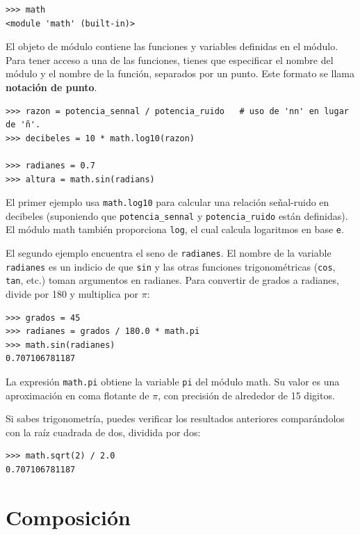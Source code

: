 \documentclass[10pt]{book}
\begin{document}
\begin{verbatim}
>>> math
<module 'math' (built-in)>
\end{verbatim}
%
El objeto de módulo contiene las funciones y variables definidas en el
módulo. Para tener acceso a una de las funciones, tienes que especificar el nombre
del módulo y el nombre de la función, separados por un punto.
Este formato se llama {\bf notación de punto}.

\begin{verbatim}
>>> razon = potencia_sennal / potencia_ruido   # uso de 'nn' en lugar de 'ñ'.
>>> decibeles = 10 * math.log10(razon)

>>> radianes = 0.7
>>> altura = math.sin(radians)
\end{verbatim}
%
El primer ejemplo usa \verb"math.log10" para calcular
una relación señal-ruido en decibeles (suponiendo que \verb"potencia_sennal" y
\verb"potencia_ruido" están definidas).  El módulo math también proporciona {\tt log},
el cual calcula logaritmos en base {\tt e}.

El segundo ejemplo encuentra el seno de {\tt radianes}.  El nombre de la variable {\tt radianes} es un indicio de que {\tt sin} y las otras funciones
trigonométricas ({\tt cos}, {\tt tan}, etc.)  toman argumentos en radianes. Para
convertir de grados a radianes, divide por 180 y multiplica por
$\pi$:

\begin{verbatim}
>>> grados = 45
>>> radianes = grados / 180.0 * math.pi
>>> math.sin(radianes)
0.707106781187
\end{verbatim}
%
La expresión {\tt math.pi} obtiene la variable {\tt pi} del módulo
math.  Su valor es una aproximación en coma flotante
de $\pi$, con precisión de alrededor de 15 digitos.

Si sabes
trigonometría, puedes verificar los resultados anteriores comparándolos con
la raíz cuadrada de dos, dividida por dos:

\begin{verbatim}
>>> math.sqrt(2) / 2.0
0.707106781187
\end{verbatim}
%

\section{Composición}
\end{document}

